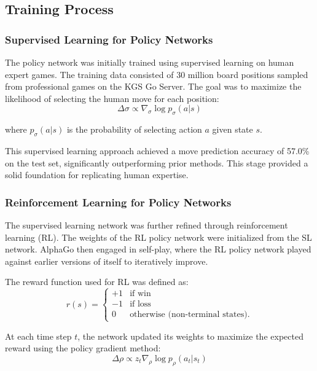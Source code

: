 \subsection{Training Process}

\subsubsection{Supervised Learning for Policy Networks}
The policy network was initially trained using supervised learning on human
expert games. The training data consisted of 30 million board positions sampled
from professional games on the KGS Go Server. The goal was to maximize the
likelihood of selecting the human move for each position:
\begin{equation}
    \Delta \sigma \propto \nabla_\sigma \log p_\sigma(a | s)
\end{equation}

where \( p_\sigma(a | s) \) is the probability of selecting action \( a \)
given state \( s \).

This supervised learning approach achieved a move prediction accuracy of 57.0\%
on the test set, significantly outperforming prior methods. This stage provided
a solid foundation for replicating human expertise.

\subsubsection{Reinforcement Learning for Policy Networks}
The supervised learning network was further refined through reinforcement
learning (RL). The weights of the RL policy network were initialized from the
SL network. AlphaGo then engaged in self-play, where the RL policy network
played against earlier versions of itself to iteratively improve.

The reward function used for RL was defined as:
\begin{equation}
    r(s) =
    \begin{cases}
        +1 & \text{if win}                           \\
        -1 & \text{if loss}                          \\
        0  & \text{otherwise (non-terminal states).}
    \end{cases}
\end{equation}

At each time step \( t \), the network updated its weights to maximize the
expected reward using the policy gradient method:
\begin{equation}
    \Delta \rho \propto z_t \nabla_\rho \log p_\rho(a_t | s_t)
\end{equation}

